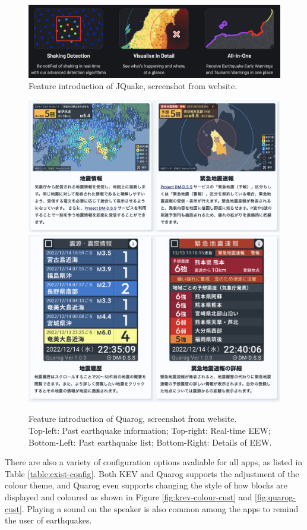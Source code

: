 \documentclass{article}
\begin{document}
\begin{figure}[!ht]
    \centering

    \includegraphics[width=0.6\linewidth]{jquake-features.png}
    \caption[Feature introduction of JQuake]{Feature introduction of JQuake, screenshot from website.}
    \label{fig:jquake-monitor-features}
\end{figure}

\begin{figure}[!ht]
    \centering

    \includegraphics[width=0.6\linewidth]{quarog-features-1.png}\\
    \includegraphics[width=0.6\linewidth]{quarog-features-2.png}
    \caption[Feature introduction of Quarog]{Feature introduction of Quarog, screenshot from website.\\Top-left: Past earthquake information; Top-right: Real-time EEW;\\Bottom-Left: Past earthquake list; Bottom-Right: Details of EEW.}
    \label{fig:quarog-monitor-features}
\end{figure}

There are also a variety of configuration options avaliable for all apps, as listed in Table \ref{table:exist-config}. Both KEV and Quarog supports the adjustment of the colour theme, and Quarog even supports changing the style of how blocks are displayed and coloured as shown in Figure \ref{fig:krev-colour-cust} and \ref{fig:quarog-cust}. Playing a sound on the speaker is also common among the apps to remind the user of earthquakes.
\end{document}
